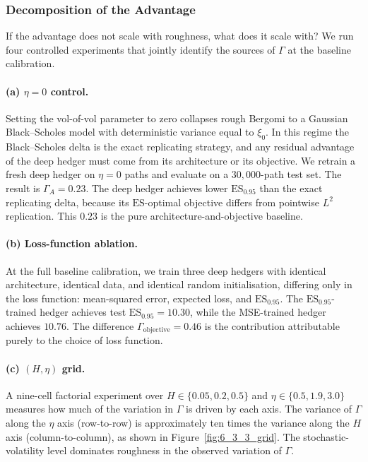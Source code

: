 \documentclass[12pt,a4paper]{article}
\theoremstyle{definition}
\theoremstyle{plain}
\theoremstyle{remark}
\theoremstyle{plain}
\begin{document}
\subsubsection{Decomposition of the Advantage}
\label{sec:6_3_3}

If the advantage does not scale with roughness, what does it scale
with? We run four controlled experiments that jointly identify
the sources of $\Gamma$ at the baseline calibration.

\paragraph{(a) $\eta = 0$ control.} Setting the vol-of-vol parameter
to zero collapses rough Bergomi to a Gaussian Black--Scholes model
with deterministic variance equal to $\xi_0$. In this regime the
Black--Scholes delta is the exact replicating strategy, and any
residual advantage of the deep hedger must come from its
architecture or its objective. We retrain a fresh deep hedger on
$\eta = 0$ paths and evaluate on a $30{,}000$-path test set. The
result is $\Gamma_{A} = 0.23$. The deep hedger achieves lower
$\mathrm{ES}_{0.95}$ than the exact replicating delta, because
its $\mathrm{ES}$-optimal objective differs from pointwise $L^2$
replication. This $0.23$ is the pure architecture-and-objective
baseline.

\paragraph{(b) Loss-function ablation.} At the full baseline
calibration, we train three deep hedgers with identical
architecture, identical data, and identical random initialisation,
differing only in the loss function: mean-squared error, expected
loss, and $\mathrm{ES}_{0.95}$. The $\mathrm{ES}_{0.95}$-trained
hedger achieves test $\mathrm{ES}_{0.95} = 10.30$, while the
MSE-trained hedger achieves $10.76$. The difference
$\Gamma_{\text{objective}} = 0.46$ is the contribution
attributable purely to the choice of loss function.

\paragraph{(c) $(H, \eta)$ grid.} A nine-cell factorial experiment
over $H \in \{0.05, 0.2, 0.5\}$ and
$\eta \in \{0.5, 1.9, 3.0\}$ measures how much of the variation
in $\Gamma$ is driven by each axis. The variance of $\Gamma$ along
the $\eta$ axis (row-to-row) is approximately ten times the
variance along the $H$ axis (column-to-column), as shown in
Figure~\ref{fig:6_3_3_grid}. The stochastic-volatility level
dominates roughness in the observed variation of $\Gamma$.
\end{document}
